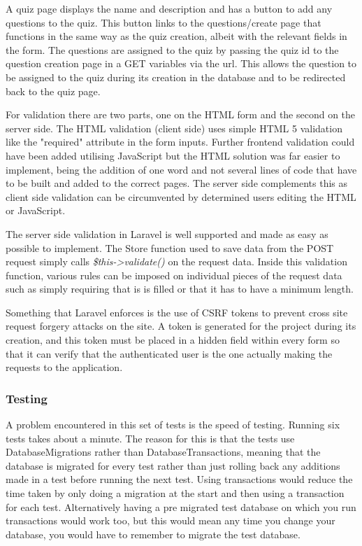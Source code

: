 A quiz page displays the name and description and has a button to add any questions to the quiz. This button links to the questions/create page that functions in the same way as the quiz creation, albeit with the relevant fields in the form. The questions are assigned to the quiz by passing the quiz id to the question creation page in a GET variables via the url. This allows the question to be assigned to the quiz during its creation in the database and to be redirected back to the quiz page.

For validation there are two parts, one on the HTML form and the second on the server side. The HTML validation (client side) uses simple HTML 5 validation like the "required" attribute in the form inputs. Further frontend validation could have been added utilising JavaScript but the HTML solution was far easier to implement, being the addition of one word and not several lines of code that have to be built and added to the correct pages. The server side complements this as client side validation can be circumvented by determined users editing the HTML or JavaScript.

The server side validation in Laravel is well supported and made as easy as possible to implement. The Store function used to save data from the POST request simply calls \textit{\$this-\textgreater validate()} on the request data. Inside this validation function, various rules can be imposed on individual pieces of the request data such as simply requiring that is is filled or that it has to have a minimum length\cite{laravel-validation}.

Something that Laravel enforces is the use of CSRF tokens to prevent cross site request forgery attacks on the site. A token is generated for the project during its creation, and this token must be placed in a hidden field within every form so that it can verify that the authenticated user is the one actually making the requests to the application\cite{laravel-csrf}.
\subsubsection{Testing}
A problem encountered in this set of tests is the speed of testing. Running six tests takes about a minute. The reason for this is that the tests use DatabaseMigrations rather than DatabaseTransactions, meaning that the database is migrated for every test rather than just rolling back any additions made in a test before running the next test. Using transactions would reduce the time taken by only doing a migration at the start and then using a transaction for each test. Alternatively having a pre migrated test database on which you run transactions would work too, but this would mean any time you change your database, you would have to remember to migrate the test database.

